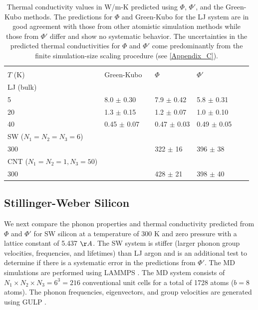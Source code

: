 \documentclass[12pt,twocolumn,iop]{/usr/share/texmf-texlive/tex/latex/iop/iopart}[/usr/share/texmf-texlive/tex/latex/iop/]
\begin{document}
\begin{center}
\begin{table}
\caption{\label{T:cond_table}Thermal conductivity values in W/m-K predicted using $\Phi$, $\Phi'$, and the Green-Kubo methods.  The predictions for $\Phi$ and Green-Kubo for the LJ system are in good agreement with those from other atomistic simulation methods\cite{turney2009a} while those from $\Phi'$ differ and show no systematic behavior. The uncertainties in the predicted thermal conductivities for $\Phi$ and $\Phi'$ come predominantly from the finite simulation-size scaling procedure (see \ref{Appendix_C}).}
\begin{ruledtabular}
\begin{tabular}{llllll}
     &                             &         &      &   \\
$T$ (K)&Green-Kubo \ &$\Phi$ &$\Phi'$\\
\hline
LJ (bulk)\\
5&8.0 $\pm$ 0.30 &7.9 $\pm$ 0.42 &5.8 $\pm$ 0.31 \\
20&1.3 $\pm$ 0.15 &1.2 $\pm$ 0.07 &1.0 $\pm$ 0.10 \\
40&0.45 $\pm$ 0.07 &0.47 $\pm$ 0.03 &0.49 $\pm$ 0.05 \\
\hline
SW ($N_1=N_2=N_3=6$) \\
300& &322 $\pm$ 16 &396 $\pm$ 38 \\
\hline
CNT ($N_1=N_2=1, N_3=50$) \\
300& &428 $\pm$ 21 &398 $\pm$ 40 \\
\end{tabular}
\end{ruledtabular}
\end{table}
\end{center}

\vspace*{70mm}

\subsection{\label{S:Subsection_prop_SW}Stillinger-Weber Silicon}

We next compare the phonon properties and thermal conductivity predicted from $\Phi$ and $\Phi'$ for SW silicon \cite{stillinger1985} at a temperature of $300$ K and zero pressure with a lattice constant of 5.437 $\AA$. The SW system is stiffer (larger phonon group velocities, frequencies, and lifetimes) than LJ argon and is an additional test to determine if there is a systematic error in the predictions from $\Phi'$. The MD simulations are performed using LAMMPS \cite{LAMMPS}. The MD system consists
of $N_1 \times N_2 \times N_3 = 6^3 = 216$ conventional unit cells for a total of 1728 atoms ($b=8$ atoms). The phonon frequencies, eigenvectors, and group velocities are generated using GULP \cite{GULP}.
\end{document}

